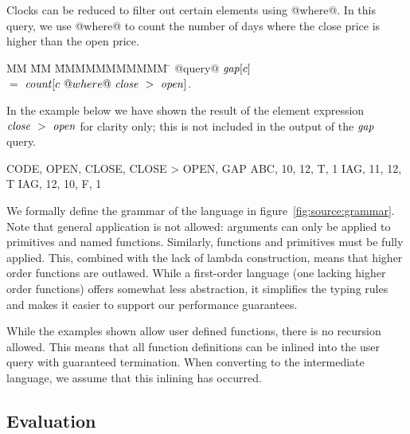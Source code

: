 Clocks can be reduced to filter out certain elements using @where@.
In this query, we use @where@ to count the number of days where the close price is higher than the open price.
\begin{tabbing}
MM \= MM \= MMMMMMMMMMM \= \kill
@query@ 
$\mathit{gap}[c]$                                        \\
 \> $=$  \> $\mathit{count}[c~@where@~\mathit{close}~>~\mathit{open}]$.       \\
\end{tabbing}

In the example below we have shown the result of the element expression $\mathit{close}~>~\mathit{open}$ for clarity only; this is not included in the output of the $\mathit{gap}$ query.


\begin{code}
CODE, OPEN, CLOSE, CLOSE > OPEN, GAP
ABC,    10,    12,            T,   1
IAG,    11,    12,            T
IAG,    12,    10,            F,   1
\end{code}


We formally define the grammar of the language in figure~\ref{fig:source:grammar}.
Note that general application is not allowed: arguments can only be applied to primitives and named functions.
Similarly, functions and primitives must be fully applied.
This, combined with the lack of lambda construction, means that higher order functions are outlawed.
While a first-order language (one lacking higher order functions) offers somewhat less abstraction, it simplifies the typing rules and makes it easier to support our performance guarantees.

While the examples shown allow user defined functions, there is no recursion allowed.
This means that all function definitions can be inlined into the user query with guaranteed termination.
When converting to the intermediate language, we assume that this inlining has occurred.


\subsection{Evaluation}

